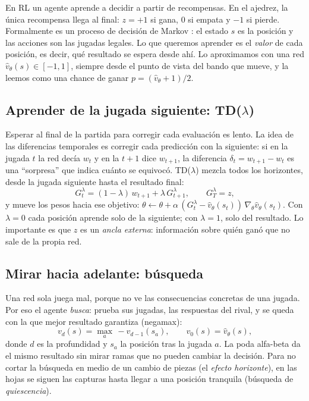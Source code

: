 \documentclass[11pt,a4paper]{article}
\newcommand{\vhat}{\hat v_\theta}
\begin{document}
En RL un agente aprende a decidir a partir de recompensas. En el ajedrez,
la única recompensa llega al final: $z=+1$ si gana, $0$ si empata y $-1$ si
pierde. Formalmente es un proceso de decisión de Markov
\citep{sutton2018}: el estado $s$ es la posición y las acciones son las
jugadas legales. Lo que queremos aprender es el \emph{valor} de cada
posición, es decir, qué resultado se espera desde ahí. Lo aproximamos con una
red $\vhat(s)\in[-1,1]$, siempre desde el punto de vista del bando que
mueve, y la leemos como una chance de ganar $p=(\vhat+1)/2$.

\subsection{Aprender de la jugada siguiente: TD($\lambda$)}

Esperar al final de la partida para corregir cada evaluación es lento. La
idea de las diferencias temporales \citep{sutton1988} es corregir cada
predicción con la siguiente: si en la jugada $t$ la red decía $w_t$ y en la
$t+1$ dice $w_{t+1}$, la diferencia $\delta_t=w_{t+1}-w_t$ es una
``sorpresa'' que indica cuánto se equivocó. TD($\lambda$) mezcla todos los
horizontes, desde la jugada siguiente hasta el resultado final:
\begin{equation}
G_t^\lambda = (1-\lambda)\,w_{t+1} + \lambda\,G_{t+1}^\lambda,
\qquad G_T^\lambda = z,
\label{eq:lambda}
\end{equation}
y mueve los pesos hacia ese objetivo:
$\theta \leftarrow \theta + \alpha\,(G_t^\lambda - \vhat(s_t))\,\nabla_\theta \vhat(s_t)$.
Con $\lambda=0$ cada posición aprende solo de la siguiente; con
$\lambda=1$, solo del resultado. Lo importante es que $z$ es un \emph{ancla
externa}: información sobre quién ganó que no sale de la propia red.

\subsection{Mirar hacia adelante: búsqueda}

Una red sola juega mal, porque no ve las consecuencias concretas de una
jugada. Por eso el agente \emph{busca}: prueba sus jugadas, las respuestas
del rival, y se queda con la que mejor resultado garantiza (negamax):
\begin{equation}
v_d(s)=\max_{a}\, -v_{d-1}(s_a), \qquad v_0(s)=\vhat(s),
\end{equation}
donde $d$ es la profundidad y $s_a$ la posición tras la jugada $a$. La poda
alfa-beta \citep{knuth1975} da el mismo resultado sin mirar ramas que no
pueden cambiar la decisión. Para no cortar la búsqueda en medio de un
cambio de piezas (el \emph{efecto horizonte}), en las hojas se siguen las
capturas hasta llegar a una posición tranquila (búsqueda de
\emph{quiescencia}).
\end{document}
